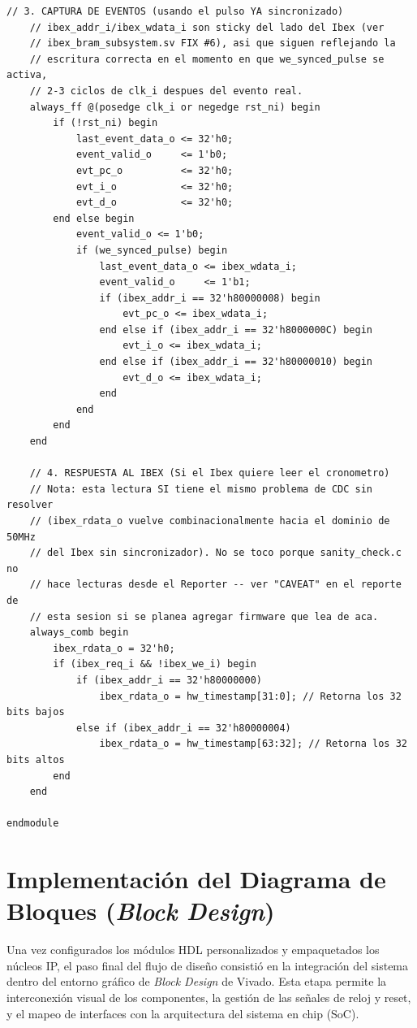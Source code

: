 \begin{lstlisting}[style=verilogstyle, basicstyle=\ttfamily\footnotesize, caption={Código fuente del subsistema \texttt{reporter\_core.sv}}, label={code:reporter_core.sv}]
    // 3. CAPTURA DE EVENTOS (usando el pulso YA sincronizado)
    // ibex_addr_i/ibex_wdata_i son sticky del lado del Ibex (ver
    // ibex_bram_subsystem.sv FIX #6), asi que siguen reflejando la
    // escritura correcta en el momento en que we_synced_pulse se activa,
    // 2-3 ciclos de clk_i despues del evento real.
    always_ff @(posedge clk_i or negedge rst_ni) begin
        if (!rst_ni) begin
            last_event_data_o <= 32'h0;
            event_valid_o     <= 1'b0;
            evt_pc_o          <= 32'h0;
            evt_i_o           <= 32'h0;
            evt_d_o           <= 32'h0;
        end else begin
            event_valid_o <= 1'b0;
            if (we_synced_pulse) begin
                last_event_data_o <= ibex_wdata_i;
                event_valid_o     <= 1'b1;
                if (ibex_addr_i == 32'h80000008) begin
                    evt_pc_o <= ibex_wdata_i;
                end else if (ibex_addr_i == 32'h8000000C) begin
                    evt_i_o <= ibex_wdata_i;
                end else if (ibex_addr_i == 32'h80000010) begin
                    evt_d_o <= ibex_wdata_i;
                end
            end
        end
    end

    // 4. RESPUESTA AL IBEX (Si el Ibex quiere leer el cronometro)
    // Nota: esta lectura SI tiene el mismo problema de CDC sin resolver
    // (ibex_rdata_o vuelve combinacionalmente hacia el dominio de 50MHz
    // del Ibex sin sincronizador). No se toco porque sanity_check.c no
    // hace lecturas desde el Reporter -- ver "CAVEAT" en el reporte de
    // esta sesion si se planea agregar firmware que lea de aca.
    always_comb begin
        ibex_rdata_o = 32'h0;
        if (ibex_req_i && !ibex_we_i) begin
            if (ibex_addr_i == 32'h80000000)
                ibex_rdata_o = hw_timestamp[31:0]; // Retorna los 32 bits bajos
            else if (ibex_addr_i == 32'h80000004)
                ibex_rdata_o = hw_timestamp[63:32]; // Retorna los 32 bits altos
        end
    end

endmodule
\end{lstlisting}




\section{Implementación del Diagrama de Bloques (\textit{Block Design})}
Una vez configurados los módulos HDL personalizados y empaquetados los núcleos IP, el paso final del flujo de diseño consistió en la integración del sistema dentro del entorno gráfico de \textit{Block Design} de Vivado. Esta etapa permite la interconexión visual de los componentes, la gestión de las señales de reloj y reset, y el mapeo de interfaces con la arquitectura del sistema en chip (SoC).

